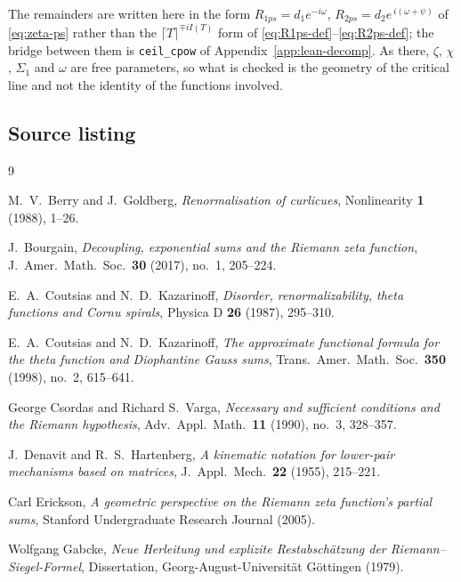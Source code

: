 \documentclass[11pt]{article}
\theoremstyle{definition}
\begin{document}
The remainders are written here in the form $R_{1ps}=d_1e^{-i\omega}$,
$R_{2ps}=d_2e^{\,i(\omega+\psi)}$ of \eqref{eq:zeta-ps} rather than the
$\lceil T\rceil^{\mp iI(T)}$ form of
\eqref{eq:R1ps-def}--\eqref{eq:R2ps-def}; the bridge between them is
\texttt{ceil\_cpow} of Appendix~\ref{app:lean-decomp}. As there, $\zeta$, $\chi$,
$\Sigma_1$ and $\omega$ are free parameters, so what is checked is the geometry
of the critical line and not the identity of the functions involved.

\subsection{Source listing}



\begin{thebibliography}{9}

M.~V.\ Berry and J.~Goldberg, \emph{Renormalisation of curlicues},
Nonlinearity \textbf{1} (1988), 1--26.

J.~Bourgain, \emph{Decoupling, exponential sums and the Riemann zeta function},
J.\ Amer.\ Math.\ Soc.\ \textbf{30} (2017), no.~1, 205--224.

E.~A.\ Coutsias and N.~D.\ Kazarinoff, \emph{Disorder, renormalizability, theta
functions and Cornu spirals}, Physica D \textbf{26} (1987), 295--310.

E.~A.\ Coutsias and N.~D.\ Kazarinoff, \emph{The approximate functional formula
for the theta function and Diophantine Gauss sums}, Trans.\ Amer.\ Math.\ Soc.\
\textbf{350} (1998), no.~2, 615--641.

George Csordas and Richard S.\ Varga, \emph{Necessary and sufficient conditions
and the Riemann hypothesis}, Adv.\ Appl.\ Math.\ \textbf{11} (1990), no.~3,
328--357.

J.~Denavit and R.~S.\ Hartenberg, \emph{A kinematic notation for lower-pair
mechanisms based on matrices}, J.\ Appl.\ Mech.\ \textbf{22} (1955), 215--221.

Carl Erickson, \emph{A geometric perspective on the Riemann zeta function's
partial sums}, Stanford Undergraduate Research Journal (2005).

Wolfgang Gabcke, \emph{Neue Herleitung und explizite Restabsch\"atzung der
Riemann--Siegel-Formel}, Dissertation, Georg-August-Universit\"at
G\"ottingen (1979).


\end{thebibliography}
\end{document}
